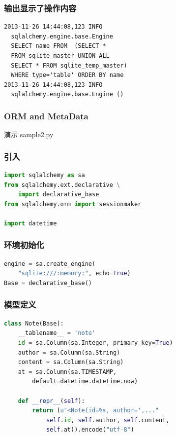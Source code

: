 \documentclass{beamer}
\begin{document}
\begin{frame}[containsverbatim]
  \frametitle{输出显示了操作内容}
  \begin{lstlisting}
2013-11-26 14:44:08,123 INFO 
  sqlalchemy.engine.base.Engine 
  SELECT name FROM  (SELECT * 
  FROM sqlite_master UNION ALL   
  SELECT * FROM sqlite_temp_master) 
  WHERE type='table' ORDER BY name 
2013-11-26 14:44:08,123 INFO 
  sqlalchemy.engine.base.Engine ()

  \end{lstlisting}
\end{frame}

\begin{frame}
  \frametitle{ORM and MetaData}
  \begin{center}
    \huge{演示 sample2.py }
  \end{center}
\end{frame}

\begin{frame}[containsverbatim]
  \frametitle{引入}
  \begin{lstlisting}[language=Python]
import sqlalchemy as sa
from sqlalchemy.ext.declarative \
    import declarative_base
from sqlalchemy.orm import sessionmaker

import datetime
  \end{lstlisting}
\end{frame}

\begin{frame}[containsverbatim]
  \frametitle{环境初始化}
  \begin{lstlisting}[language=python]
engine = sa.create_engine(
    "sqlite:///:memory:", echo=True)
Base = declarative_base()
  \end{lstlisting}
\end{frame}

\begin{frame}[containsverbatim]
  \frametitle{模型定义}
  \begin{lstlisting}[language=python]
class Note(Base):
    __tablename__ = 'note'
    id = sa.Column(sa.Integer, primary_key=True)
    author = sa.Column(sa.String)
    content = sa.Column(sa.String)
    at = sa.Column(sa.TIMESTAMP, 
        default=datetime.datetime.now)

    def __repr__(self):
        return (u"<Note(id=%s, author=',..."
            self.id, self.author, self.content, 
            self.at)).encode("utf-8")
  \end{lstlisting}
\end{frame}
\end{document}
